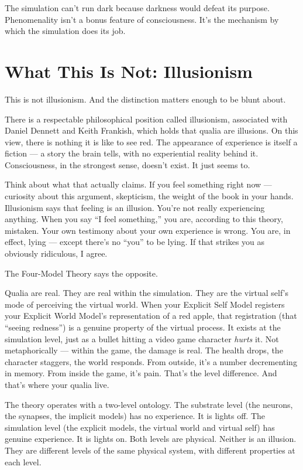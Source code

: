 \documentclass[11pt, twoside, openright]{book}
\begin{document}
The simulation can't run dark because darkness would defeat its purpose. Phenomenality isn't a bonus feature of consciousness. It's the mechanism by which the simulation does its job.

\section*{What This Is Not: Illusionism}

This is not illusionism. And the distinction matters enough to be blunt about.

There is a respectable philosophical position called illusionism, associated with Daniel Dennett and Keith Frankish, which holds that qualia are illusions. On this view, there is nothing it is like to see red. The appearance of experience is itself a fiction --- a story the brain tells, with no experiential reality behind it. Consciousness, in the strongest sense, doesn't exist. It just seems to.

Think about what that actually claims. If you feel something right now --- curiosity about this argument, skepticism, the weight of the book in your hands. Illusionism says that feeling is an illusion. You're not really experiencing anything. When you say ``I feel something,'' you are, according to this theory, mistaken. Your own testimony about your own experience is wrong. You are, in effect, lying --- except there's no ``you'' to be lying. If that strikes you as obviously ridiculous, I agree.

The Four-Model Theory says the opposite.

Qualia are real. They are real within the simulation. They are the virtual self's mode of perceiving the virtual world. When your Explicit Self Model registers your Explicit World Model's representation of a red apple, that registration (that ``seeing redness'') is a genuine property of the virtual process. It exists at the simulation level, just as a bullet hitting a video game character \textit{hurts} it. Not metaphorically --- within the game, the damage is real. The health drops, the character staggers, the world responds. From outside, it's a number decrementing in memory. From inside the game, it's pain. That's the level difference. And that's where your qualia live.

The theory operates with a two-level ontology. The substrate level (the neurons, the synapses, the implicit models) has no experience. It is lights off. The simulation level (the explicit models, the virtual world and virtual self) has genuine experience. It is lights on. Both levels are physical. Neither is an illusion. They are different levels of the same physical system, with different properties at each level.
\end{document}
